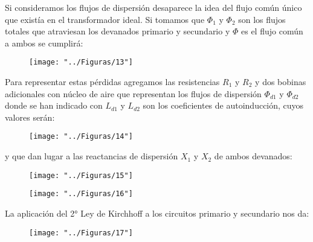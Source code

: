 Si consideramos los flujos de dispersión desaparece la idea del flujo común único que existía en el transformador ideal. Si tomamos que $\Phi_{1}$ y $\Phi_{2}$ son los flujos totales que atraviesan los devanados primario y secundario y $\Phi$ es el flujo común a ambos se cumplirá:

\begin{figure}[H]
	\centering
	\texttt{[image: "../Figuras/13"]}
\end{figure} 

Para representar estas pérdidas agregamos las resistencias $R_{1}$ y $R_{2}$ y dos bobinas adicionales con núcleo de aire que representan los flujos de dispersión $\Phi_{d1}$ y $\Phi_{d2}$ donde se han indicado con $L_{d1}$ y $L_{d2}$ son los coeficientes de autoinducción, cuyos valores serán:

\begin{figure}[H]
	\centering
	\texttt{[image: "../Figuras/14"]}
\end{figure} 

y que dan lugar a las reactancias de dispersión $X_{1}$ y $X_{2}$ de ambos devanados:
\begin{figure}[H]
	\centering
	\texttt{[image: "../Figuras/15"]}
\end{figure} 

\begin{figure}[H]
	\centering
	\texttt{[image: "../Figuras/16"]}
\end{figure} 

La aplicación del 2° Ley de Kirchhoff a los circuitos primario y secundario nos da:

\begin{figure}[H]
	\centering
	\texttt{[image: "../Figuras/17"]}
\end{figure} 